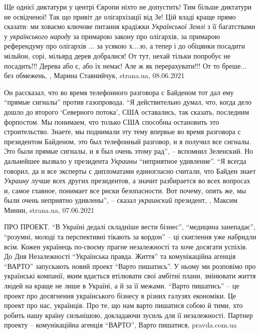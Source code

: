 Ще однієї диктатури у центрі Європи ніхто не допустить! Тим більше диктатури не
освідченої!  Так що привіт де олігархізації від Зе!  Цій владі краще прямо
сказати: ми ховаємо ключове питання крадіжки \emph{Української Землі} з її
багатствами у \emph{українського народу} за примарою закону про олігархів, за примарою
референдуму про олігархів ... за усякою х....ю, а тепер і до обіцянки посадити
мільйон, сорі, мільярд дерев добралися!  От тут, нехай тільки попробує не
посадить!!!  Дерева або є, або їх немає! Але ж як перерахувати!!! От то
бреше... без обмежень,
, Марина Ставнийчук, strana.ua, 08.06.2021

Он рассказал, что во время телефонного разговора с Байденом тот дал ему
\enquote{прямые сигналы} против газопровода.  \enquote{Я действительно думал,
что, когда дело дошло до второго \enquote{Северного потока}, США оставались,
так сказать, последним форпостом. Мы понимаем, что только США способны
остановить это строительство. Знаете, мы поднимали эту тему впервые во время
разговора с президентом Байденом, это был телефонный разговор, и я получил все
сигналы. Это были прямые сигналы, и я был очень этому рад}, – вспомнил
Зеленский.  Но дальнейшее вызвало у президента \emph{Украины}
\enquote{неприятное удивление}.  \enquote{Я всегда говорил, да и все эксперты с
дипломатами единогласно считали, что Байден знает \emph{Украину} лучше всех
других президентов, а значит разбирается во всех вопросах и, самое главное,
понимает все риски безопасности. Вот почему, опять же, мы были очень неприятно
удивлены}, – сказал \emph{украинский} президент,
, Максим Минин, strana.ua, 07.06.2021

ПРО ПРОЕКТ.  \enquote{В Україні дедалі складніше вести бізнес}, \enquote{медицина занепадає},
\enquote{розумні, молоді та перспективні тікають за кордон} – ці скиглення уже набридли
всім.  Кожен українець по-своєму прагне незалежності та хоче досягати успіхів.
До Дня Незалежності \enquote{Українська правда. Життя} та комунікаційна агенція \enquote{ВАРТО}
запускають новий проект \enquote{Варто пишатись}.  У ньому ми розповімо про українські
компанії, яким вдається втілювати свої амбітні плани, змінювати життя людей на
краще не лише в Україні, а й за її межами.  \enquote{Варто пишатись} – це проект про
досягнення українського бізнесу в різних галузях економіки.  Це проект про нас,
українців. Про те, що нам варто пишатися собою й тими, хто робить нашу країну
сильнішою, докладаючи зусиль для її незалежності.  Партнер проекту –
комунікаційна агенція \enquote{ВАРТО}, Варто пишатися, pravda.com.ua

